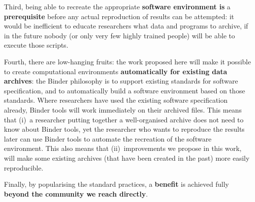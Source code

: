 Third, being able to recreate the appropriate \textbf{software environment is} a
\textbf{prerequisite} before any actual reproduction of results can be attempted: it
would be inefficient to educate researchers what data and programs to archive,
if in the future nobody (or only very few highly trained people) will be able to
execute those scripts.

Fourth, there are low-hanging fruits: the work proposed here will
make it possible to create computational environments \textbf{automatically for
existing data archives}: the Binder philosophy is to support existing standards for software
specification, and to automatically build a software environment based on those standards.
Where researchers have used the existing software specification already, Binder tools
will work immediately on their archived files. This means that (i)~a researcher
putting together a well-organised archive does not need to know about Binder tools,
yet the researcher who wants to reproduce the results later can use Binder tools to
automate the recreation of the software environment. This also means that
(ii)~improvements we propose in this work, will make some existing archives (that
have been created in the past) more easily reproducible.

Finally, by popularising the standard practices, a \textbf{benefit} is achieved fully
\textbf{beyond the community we reach directly}.

